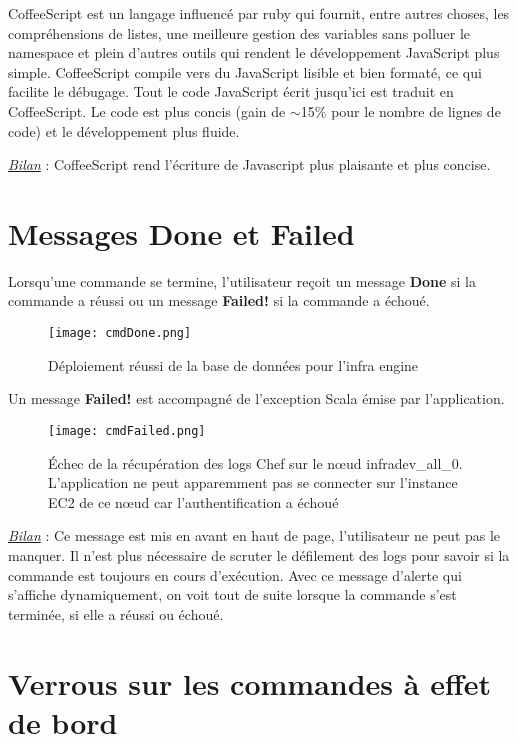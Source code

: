 CoffeeScript est un langage influencé par ruby qui fournit, entre autres choses,
les compréhensions de listes, une meilleure gestion des variables sans polluer
le namespace et plein d'autres outils qui rendent le développement JavaScript
plus simple. CoffeeScript compile vers du JavaScript lisible et bien formaté,
ce qui facilite le débugage.
Tout le code JavaScript écrit jusqu'ici est traduit en CoffeeScript.
Le code est plus concis (gain de $\sim$15\% pour le nombre de lignes de code) et le
développement plus fluide.

\underline{\textit{Bilan}} : CoffeeScript rend l'écriture de Javascript plus
plaisante et plus concise.

\section{Messages Done et Failed}

Lorsqu'une commande se termine, l'utilisateur reçoit un message \textbf{Done} si la
commande a réussi ou un message \textbf{Failed!} si la commande a échoué.

\begin{figure}[H]
  \texttt{[image: cmdDone.png]}
  \caption{Déploiement réussi de la base de données pour l'infra engine}
\end{figure}

Un message \textbf{Failed!} est accompagné de l'exception Scala émise par
l'application.

\begin{figure}[H]
  \texttt{[image: cmdFailed.png]}
  \caption{Échec de la récupération des logs Chef sur le nœud infradev\_all\_0.\\
    L'application ne peut apparemment pas se connecter sur l'instance EC2 de
    ce nœud car l'authentification a échoué}
\end{figure}

\underline{\textit{Bilan}} : Ce message est mis en avant en haut de page,
l'utilisateur ne peut pas le manquer.
Il n'est plus nécessaire de scruter le défilement des logs pour savoir si la
commande est toujours en cours d'exécution. Avec ce message d'alerte qui
s'affiche dynamiquement, on voit tout de suite lorsque la commande s'est
terminée, si elle a réussi ou échoué.

\section{Verrous sur les commandes à effet de bord}

